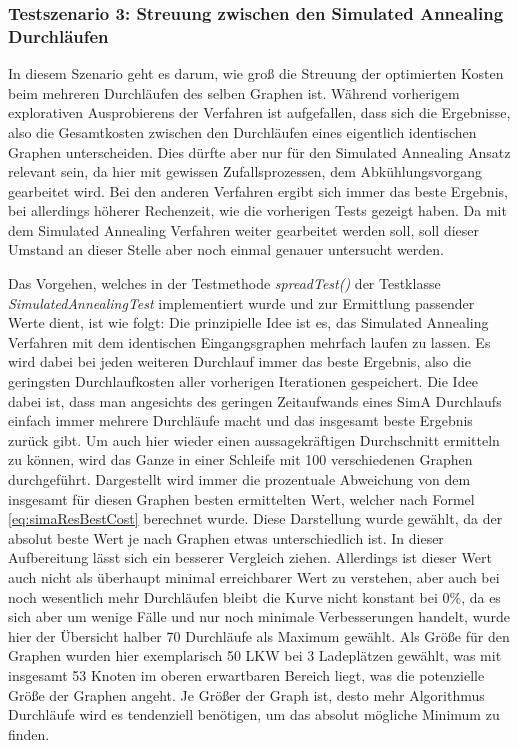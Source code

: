\subsubsection{Testszenario 3: Streuung zwischen den Simulated Annealing Durchläufen}

In diesem Szenario geht es darum, wie groß die Streuung der optimierten Kosten beim mehreren Durchläufen des selben Graphen ist. Während vorherigem explorativen Ausprobierens der Verfahren ist aufgefallen, dass sich die Ergebnisse, also die Gesamtkosten zwischen den Durchläufen eines eigentlich identischen Graphen unterscheiden. Dies dürfte aber nur für den Simulated Annealing Ansatz relevant sein, da hier mit gewissen Zufallsprozessen, dem \glqq{}Abkühlungsvorgang\grqq{} gearbeitet wird. Bei den anderen Verfahren ergibt sich immer das beste Ergebnis, bei allerdings höherer Rechenzeit, wie die vorherigen Tests gezeigt haben. Da mit dem Simulated Annealing Verfahren weiter gearbeitet werden soll, soll dieser Umstand an dieser Stelle aber noch einmal genauer untersucht werden.

Das Vorgehen, welches in der Testmethode \textit{spreadTest()} der Testklasse \textit{SimulatedAnnealingTest} implementiert wurde und zur Ermittlung passender Werte dient, ist wie folgt: Die prinzipielle Idee ist es, das Simulated Annealing Verfahren mit dem identischen Eingangsgraphen mehrfach laufen zu lassen. Es wird dabei bei jeden weiteren Durchlauf immer das beste Ergebnis, also die geringsten Durchlaufkosten aller vorherigen Iterationen gespeichert. Die Idee dabei ist, dass man angesichts des geringen Zeitaufwands eines SimA Durchlaufs einfach immer mehrere Durchläufe macht und das insgesamt beste Ergebnis zurück gibt. Um auch hier wieder einen aussagekräftigen Durchschnitt ermitteln zu können, wird das Ganze in einer Schleife mit 100 verschiedenen Graphen durchgeführt. Dargestellt wird immer die prozentuale Abweichung von dem insgesamt für diesen Graphen besten ermittelten Wert, welcher nach Formel \ref{eq:simaResBestCost} berechnet wurde. Diese Darstellung wurde gewählt, da der absolut beste Wert je nach Graphen etwas unterschiedlich ist. In dieser Aufbereitung lässt sich ein besserer Vergleich ziehen. Allerdings ist dieser Wert auch nicht als überhaupt minimal erreichbarer Wert zu verstehen, aber auch bei noch wesentlich mehr Durchläufen bleibt die Kurve nicht konstant bei 0\%, da es sich aber um wenige Fälle und nur noch minimale Verbesserungen handelt, wurde hier der Übersicht halber 70 Durchläufe als Maximum gewählt. Als Größe für den Graphen wurden hier exemplarisch 50 LKW bei 3 Ladeplätzen gewählt, was mit insgesamt 53 Knoten im oberen erwartbaren Bereich liegt, was die potenzielle Größe der Graphen angeht. Je Größer der Graph ist, desto mehr Algorithmus Durchläufe wird es tendenziell benötigen, um das absolut mögliche Minimum zu finden.

